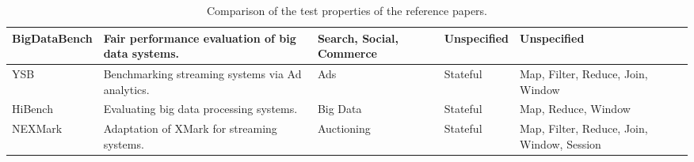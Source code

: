 \begin{table}[H]
{\begin{tabular}{|p{3cm}|p{4cm}|p{3cm}|p{2.5cm}|p{2.5cm}|}
      BigDataBench\cite{bigdatabench}
      & Fair performance evaluation of big data systems.
      & Search, Social, Commerce
      & Unspecified
      & Unspecified
      \\\hline

      YSB\cite{ysb}
      & Benchmarking streaming systems via Ad analytics.
      & Ads
      & Stateful
      & Map, Filter, Reduce, Join, Window
      \\\hline

      HiBench\cite{hibench}
      & Evaluating big data processing systems.
      & Big Data
      & Stateful
      & Map, Reduce, Window
      \\\hline

      NEXMark\cite{nexmark}
      & Adaptation of XMark for streaming systems.
      & Auctioning
      & Stateful
      & Map, Filter, Reduce, Join, Window, Session
      \\\hline
    \end{tabular}
  }
  \caption{Comparison of the test properties of the reference papers.}
  \label{table:test-properties}
\end{table}

